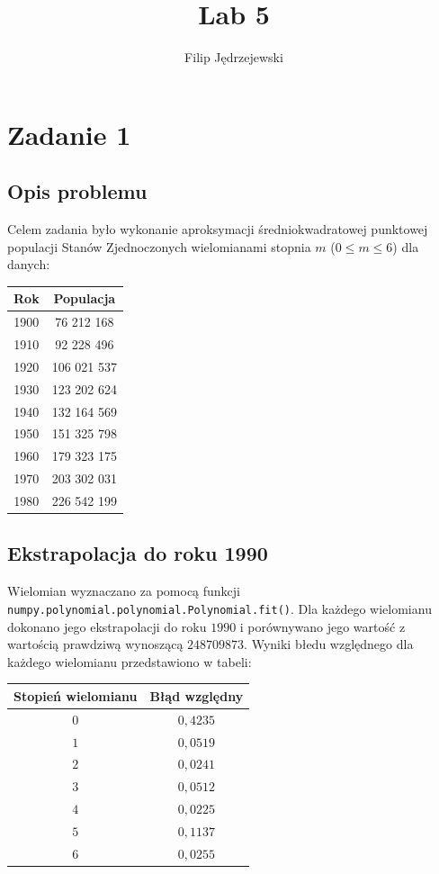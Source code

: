 \documentclass{article}
\title{Lab 5}
\author{Filip Jędrzejewski}
\begin{document}
	\maketitle
	
	\section*{Zadanie 1}
	
	\subsection*{Opis problemu}
	
	Celem zadania było wykonanie aproksymacji średniokwadratowej punktowej populacji Stanów Zjednoczonych wielomianami stopnia $m$ ($0 \leq m \leq 6$) dla danych:
	
	\begin{center}
		\begin{tabular}{c|c}
  			\hline 
  			Rok & Populacja\\
  			\hline
  			1900 & 76 212 168 \\
  			1910 & 92 228 496 \\
  			1920 & 106 021 537 \\
  			1930 & 123 202 624 \\
  			1940 & 132 164 569 \\
  			1950 & 151 325 798 \\
  			1960 & 179 323 175 \\
  			1970 & 203 302 031 \\
  			1980 & 226 542 199 \\
		\end{tabular} 
		
	\end{center}	
	
	\subsection*{Ekstrapolacja do roku 1990}
	
	Wielomian wyznaczano za pomocą funkcji \texttt{numpy.polynomial.polynomial.Polynomial.fit()}. Dla każdego wielomianu dokonano jego ekstrapolacji do roku $1990$ i porównywano jego wartość z wartością prawdziwą wynoszącą $248 709 873$. Wyniki błedu względnego dla każdego wielomianu przedstawiono w tabeli:
	
	
	\begin{center}
		\begin{tabular}{c|c}
  			\hline 
  			Stopień wielomianu & Błąd względny\\
  			\hline
  			$0$ & $0,4235$ \\
  			$1$ & $0,0519$ \\
  			$2$ & $0,0241$ \\
  			$3$ & $0,0512$ \\
  			$4$ & $0,0225$ \\
  			$5$ & $0,1137$ \\
  			$6$ & $0,0255$ \\
		\end{tabular} 
		
	\end{center}	
	
\end{document}
